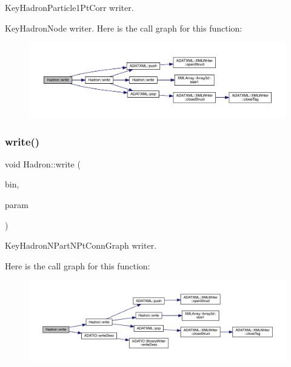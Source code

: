 Key\+Hadron\+Particle1\+Pt\+Corr writer. 

Key\+Hadron\+Node writer. Here is the call graph for this function\+:
\nopagebreak
\begin{figure}[H]
\begin{center}
\leavevmode
\includegraphics[width=350pt]{d1/daf/namespaceHadron_ab67658d0abad845f6efa3ba94de7692c_cgraph}
\end{center}
\end{figure}
\mbox{\label{namespaceHadron_a0a1d03111d7a7c9ff16ee1baf1928652}} 
\subsubsection{\texorpdfstring{write()}{write()}\hspace{0.1cm}{\footnotesize\ttfamily [77/95]}}
{\footnotesize\ttfamily void Hadron\+::write (\begin{DoxyParamCaption}\item[{\mbox{\hyperlink{classADATIO_1_1BinaryWriter}{Binary\+Writer}} \&}]{bin,  }\item[{const \mbox{\hyperlink{structHadron_1_1KeyHadronNPartNPtConnGraph__t}{Key\+Hadron\+N\+Part\+N\+Pt\+Conn\+Graph\+\_\+t}} \&}]{param }\end{DoxyParamCaption})}



Key\+Hadron\+N\+Part\+N\+Pt\+Conn\+Graph writer. 

Here is the call graph for this function\+:
\nopagebreak
\begin{figure}[H]
\begin{center}
\leavevmode
\includegraphics[width=350pt]{d1/daf/namespaceHadron_a0a1d03111d7a7c9ff16ee1baf1928652_cgraph}
\end{center}
\end{figure}
\mbox{\label{namespaceHadron_ad5c8dc860360f98655b29f17b61f2a35}} 
